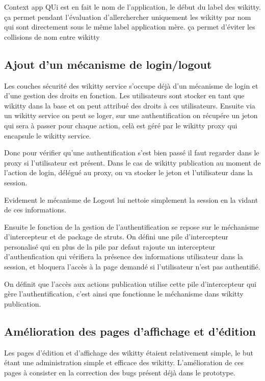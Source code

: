 Context app
QUi est en fait le nom de l'application, le début du label des wikitty.
ça permet pendant l'évaluation d'allerchercher uniquement les wikitty par
nom qui sont directement sous le même label application mère.
ça permet d'éviter les collisions de nom entre wikitty 


\subsection{Ajout d'un mécanisme de login/logout}

Les couches sécurité des wikitty service s'occupe déjà d'un mécanisme de login
et d'une gestion des droits en fonction. Les utilisateurs sont stocker en tant
que wikitty dans la base et on peut attribué des droits à ces utilisateurs.
Ensuite via un wikitty service on peut se loger, sur une authentification on
récupére un jeton qui sera à passer pour chaque action, celà est géré par le
wikitty proxy qui encapsule le wikitty service.

Donc pour vérifier qu'une authentification s'est bien passé il faut regarder
dans le proxy si l'utilisateur est présent. Dans le cas de wikitty publication
au moment de l'action de login, délégué au proxy, on va stocker le jeton et
l'utilisateur dans la session.

Evidement le mécanisme de Logout lui nettoie simplement la session en la vidant
de ces informations.

Ensuite le fonction de la gestion de l'authentification se repose sur le
méchanisme d'intercepteur et de package de struts. On défini une pile
d'intercepteur personalisé qui en plus de la pile par defaut rajoute un
intercepteur d'authenfication qui vérifiera la présence des informations
utilisateur dans la session, et bloquera l'accès à la page demandé si
l'utilisateur n'est pas authentifié.

On définit que l'accès aux actions publication utilise cette pile d'intercepteur
qui gère l'authentification, c'est ainsi que fonctionne le méchanisme dans
wikitty publication.

\subsection{Amélioration des pages d'affichage et d'édition}

Les pages d'édition et d'affichage des wikitty étaient relativement simple, le
but étant une administration simple et efficace des wikitty. L'amélioration de
ces pages à consister en la correction des bugs présent déjà dans le prototype.

